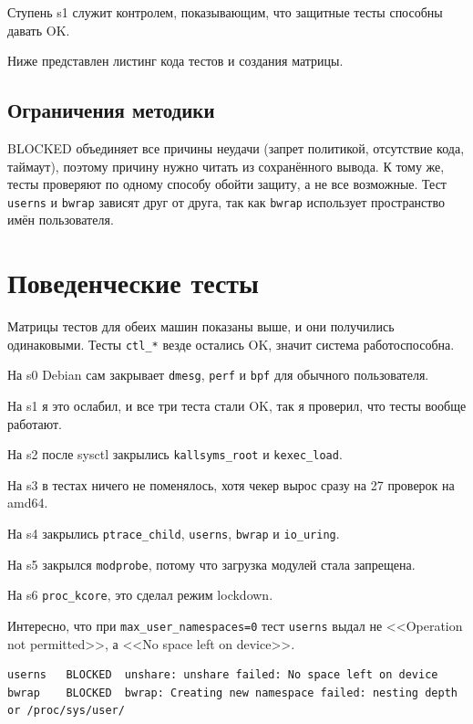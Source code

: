 \documentclass[11pt,a4paper]{article}
\newcommand{\cmd}[1]{\texttt{#1}}
\begin{document}
Ступень s1 служит контролем, показывающим, что защитные тесты способны давать OK.

Ниже представлен листинг кода тестов и создания матрицы.




\subsection*{Ограничения методики}
BLOCKED объединяет все причины неудачи (запрет политикой, отсутствие кода,
таймаут), поэтому причину нужно читать из сохранённого вывода. К тому же, тесты проверяют
по одному способу обойти защиту, а не все возможные. Тест \cmd{userns} и \cmd{bwrap}
зависят друг от друга, так как \cmd{bwrap} использует пространство имён пользователя.

\section{Поведенческие тесты}
Матрицы тестов для обеих машин показаны выше, и они получились одинаковыми. Тесты \cmd{ctl\_*} везде остались OK, значит система работоспособна.

На s0 Debian сам закрывает \cmd{dmesg}, \cmd{perf} и \cmd{bpf} для обычного пользователя.

На s1 я это ослабил, и все три теста стали OK, так я проверил, что тесты вообще работают.

На s2 после sysctl закрылись \cmd{kallsyms\_root} и \cmd{kexec\_load}.

На s3 в тестах ничего не поменялось, хотя чекер вырос сразу на 27 проверок на amd64.

На s4 закрылись \cmd{ptrace\_child}, \cmd{userns}, \cmd{bwrap} и \cmd{io\_uring}.

На s5 закрылся \cmd{modprobe}, потому что загрузка модулей стала запрещена.

На s6 \cmd{proc\_kcore}, это сделал режим lockdown.

Интересно, что при \cmd{max\_user\_namespaces=0} тест \cmd{userns} выдал не <<Operation not permitted>>, а <<No space left on device>>.
\begin{lstlisting}[numbers=none]
userns   BLOCKED  unshare: unshare failed: No space left on device
bwrap    BLOCKED  bwrap: Creating new namespace failed: nesting depth or /proc/sys/user/
\end{lstlisting}
\end{document}
